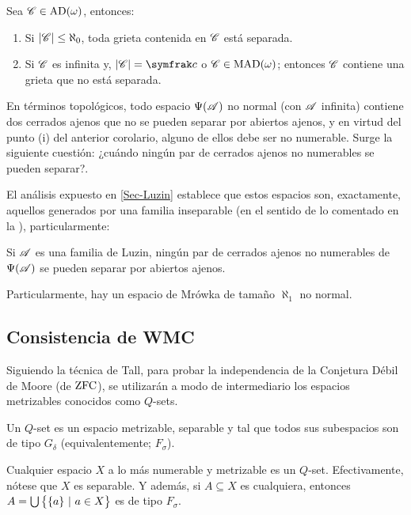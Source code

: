 \begin{corolario}\label{col-tra-interrelacion}
	Sea $\mathscr{C}\in \operatorname{AD}(\omega)$, entonces:
	\begin{enumerate}
		\item Si $|\mathscr{C}|\leq \aleph_0$, toda grieta contenida en $\mathscr{C}$ está separada.
		\item Si $\mathscr{C}$ es infinita y, $|\ms{C}|=\mathfrak{c}$ o $\mathscr{C}\in \operatorname{MAD}(\omega)$; entonces $\mathscr{C}$ contiene una grieta que no está separada.
	\end{enumerate}
\end{corolario}

En términos topológicos, todo espacio $\Psi(\mathscr{A})$ no normal (con $\mathscr{A}$ infinita) contiene dos cerrados ajenos que no se pueden separar por abiertos ajenos, y en virtud del punto (i) del anterior corolario, alguno de ellos debe ser no numerable. Surge la siguiente cuestión: ¿cuándo ningún par de cerrados ajenos no numerables se pueden separar?.

El análisis expuesto en \autoref{Sec-Luzin} establece que estos espacios son, exactamente, aquellos generados por una familia inseparable (en el sentido de lo comentado en la \pageref{def-FamInseparable}), particularmente:

\begin{corolario}\label{cor-MrowkaLuzin}
	Si $\mathscr{A}$ es una familia de Luzin, ningún par de cerrados ajenos no numerables de $\Psi(\mathscr{A})$ se pueden separar por abiertos ajenos.

	Particularmente, hay un espacio de Mrówka de tamaño $\aleph_1$ no normal.
\end{corolario}

\subsection{Consistencia de \textsf{WMC}}
\label{Sec-PDM}

Siguiendo la técnica de Tall, para probar la independencia de la Conjetura Débil de Moore (de $\operatorname{ZFC}$), se utilizarán a modo de intermediario los espacios metrizables conocidos como $Q$-sets.

\begin{definicion}\label{def-Qset}
	Un $Q$-set es un espacio metrizable, separable y tal que todos sus subespacios son de tipo $G_\delta$ (equivalentemente; $F_\sigma$).
\end{definicion}

\begin{ejemplo}\label{ej-QsetFacil}
	Cualquier espacio $X$ a lo más numerable y metrizable es un $Q$-set. Efectivamente, nótese que $X$ es separable. Y además, si $A \subseteq X$ es cualquiera, entonces $A=\mbox{$\bigcup$}\,\big\{\{a\} \text{ $|$ } a \in X\big\}$ es de tipo $F_\sigma$.
\end{ejemplo}

